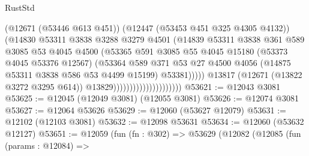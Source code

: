 \begin{lexlean}{RustStd}
\begin{coremodule}
                                                (@12671 (@53446 @613 @451))
                                                (@12447 (@53453 @451 @325 @4305 @4132))
                                                (@14830
                                                  @53311
                                                  @3838
                                                  @3288
                                                  @3279
                                                  @4501
                                                  (@14839
                                                    @53311
                                                    @3838
                                                    @361
                                                    @589
                                                    @3085
                                                    @53
                                                    @4045
                                                    @4500
                                                    (@53365
                                                      @591
                                                      @3085
                                                      @55
                                                      @4045
                                                      @15180
                                                      (@53373 @4045 @53376 @12567)
                                                      (@53364
                                                        @589
                                                        @371
                                                        @53
                                                        @27
                                                        @4500
                                                        @4056
                                                        (@14875 @53311 @3838 @586 @53 @4499 @15199)
                                                        @53381)))))
                                              @13817
                                              (@12671 (@13822 @3272 @3295 @614))
                                              @13829)))))))))))))))))))))
@53621 := @12043 @3081
@53625 := @12045 (@12049 @3081) (@12055 @3081)
@53626 := @12074 @3081
@53627 := @12064 @53626
@53629 := @12060 (@53627 @12079)
@53631 := @12102 (@12103 @3081)
@53632 := @12098 @53631
@53634 := @12060 (@53632 @12127)
@53651 := @12059
    (fun (fn : @302) =>
    @53629
      (@12082
        (@12085
          (fun (params : @12084) =>

\end{coremodule}
\end{lexlean}
